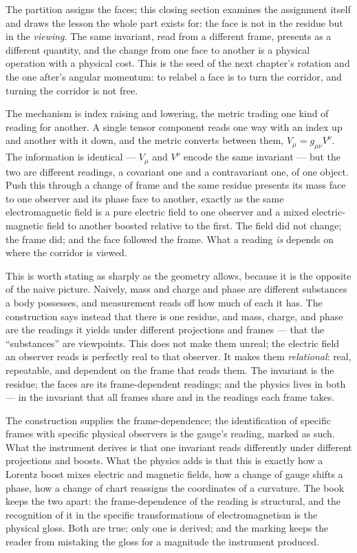 The partition assigns the faces; this closing section examines the assignment itself and draws the lesson the whole part
exists for: the face is not in the residue but in the \emph{viewing}. The same invariant, read from a different frame,
presents as a different quantity, and the change from one face to another is a physical operation with a physical cost. This
is the seed of the next chapter's rotation and the one after's angular momentum: to relabel a face is to turn the corridor,
and turning the corridor is not free.

The mechanism is index raising and lowering, the metric trading one kind of reading for another. A single tensor component
reads one way with an index up and another with it down, and the metric converts between them, $V_\mu = g_{\mu\nu} V^\nu$.
The information is identical --- $V_\mu$ and $V^\nu$ encode the same invariant --- but the two are different readings, a
covariant one and a contravariant one, of one object. Push this through a change of frame and the same residue presents its
mass face to one observer and its phase face to another, exactly as the same electromagnetic field is a pure electric field
to one observer and a mixed electric-magnetic field to another boosted relative to the first. The field did not change; the
frame did; and the face followed the frame. What a reading \emph{is} depends on where the corridor is viewed.

This is worth stating as sharply as the geometry allows, because it is the opposite of the naive picture. Naively, mass and
charge and phase are different substances a body possesses, and measurement reads off how much of each it has. The
construction says instead that there is one residue, and mass, charge, and phase are the readings it yields under different
projections and frames --- that the ``substances'' are viewpoints. This does not make them unreal; the electric field an
observer reads is perfectly real to that observer. It makes them \emph{relational}: real, repeatable, and dependent on the
frame that reads them. The invariant is the residue; the faces are its frame-dependent readings; and the physics lives in
both --- in the invariant that all frames share and in the readings each frame takes.

The construction supplies the frame-dependence; the identification of specific frames with specific physical observers is the
gauge's reading, marked as such. What the instrument derives is that one invariant reads differently under different
projections and boosts. What the physics adds is that this is exactly how a Lorentz boost mixes electric and magnetic fields,
how a change of gauge shifts a phase, how a change of chart reassigns the coordinates of a curvature. The book keeps the two
apart: the frame-dependence of the reading is structural, and the recognition of it in the specific transformations of
electromagnetism is the physical gloss. Both are true; only one is derived; and the marking keeps the reader from mistaking
the gloss for a magnitude the instrument produced.

